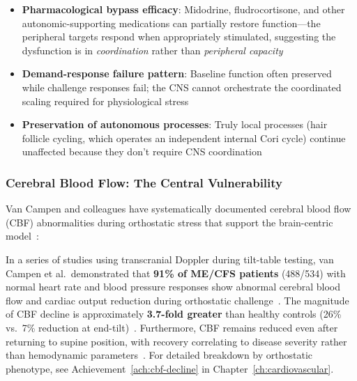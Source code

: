 \begin{itemize}
    \item \textbf{Pharmacological bypass efficacy}: Midodrine, fludrocortisone, and other autonomic-supporting medications can partially restore function---the peripheral targets respond when appropriately stimulated, suggesting the dysfunction is in \emph{coordination} rather than \emph{peripheral capacity}

    \item \textbf{Demand-response failure pattern}: Baseline function often preserved while challenge responses fail; the CNS cannot orchestrate the coordinated scaling required for physiological stress

    \item \textbf{Preservation of autonomous processes}: Truly local processes (hair follicle cycling, which operates an independent internal Cori cycle) continue unaffected because they don't require CNS coordination
\end{itemize}

\subsubsection{Cerebral Blood Flow: The Central Vulnerability}

Van Campen and colleagues have systematically documented cerebral blood flow (CBF) abnormalities during orthostatic stress that support the brain-centric model~\cite{VanCampenEtAl2020,VanCampenEtAl2021,VanCampenEtAl2023,VanCampenEtAl2024}:

\begin{achievement}
\label{ach:cbf-universal}
In a series of studies using transcranial Doppler during tilt-table testing, van Campen et al.\ demonstrated that \textbf{91\% of ME/CFS patients} (488/534) with normal heart rate and blood pressure responses show abnormal cerebral blood flow and cardiac output reduction during orthostatic challenge~\cite{VanCampenEtAl2024}. The magnitude of CBF decline is approximately \textbf{3.7-fold greater} than healthy controls (26\% vs.\ 7\% reduction at end-tilt)~\cite{VanCampenEtAl2020}. Furthermore, CBF remains reduced even after returning to supine position, with recovery correlating to disease severity rather than hemodynamic parameters~\cite{VanCampenEtAl2021}. For detailed breakdown by orthostatic phenotype, see Achievement~\ref{ach:cbf-decline} in Chapter~\ref{ch:cardiovascular}.
\end{achievement}

